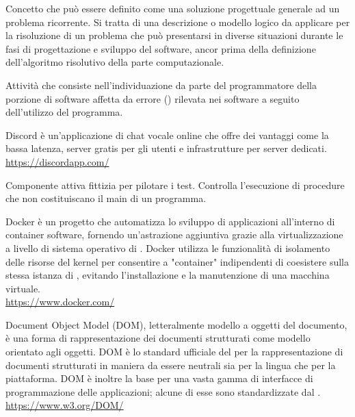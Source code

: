 Concetto che può essere definito come una soluzione progettuale generale ad un problema ricorrente. Si tratta di una descrizione o modello logico da applicare per la risoluzione di un problema che può presentarsi in diverse situazioni durante le fasi di progettazione e sviluppo del software, ancor prima della definizione dell'algoritmo risolutivo della parte computazionale.

Attività che consiste nell'individuazione da parte del programmatore della porzione di software affetta da errore () rilevata nei software a seguito dell'utilizzo del programma.

Discord è un’applicazione di chat vocale online che offre dei vantaggi come la bassa latenza, server gratis per gli utenti e infrastrutture per server dedicati.\\
\url{https://discordapp.com/}

Componente attiva fittizia per pilotare i test. Controlla l’esecuzione di procedure che non costituiscano il main di un programma.

Docker è un progetto  che automatizza lo sviluppo di applicazioni all'interno di container software, fornendo un'astrazione aggiuntiva grazie alla virtualizzazione a livello di sistema operativo di . Docker utilizza le funzionalità di isolamento delle risorse del kernel  per consentire a "container" indipendenti di coesistere sulla stessa istanza di , evitando l'installazione e la manutenzione di una macchina virtuale.\\
\url{https://www.docker.com/}

Document Object Model (DOM), letteralmente modello a oggetti del documento, è una forma di rappresentazione dei documenti strutturati come modello orientato agli oggetti.
DOM è lo standard ufficiale del  per la rappresentazione di documenti strutturati in maniera da essere neutrali sia per la lingua che per la piattaforma. DOM è inoltre la base per una vasta gamma di interfacce di programmazione delle applicazioni; alcune di esse sono standardizzate dal .\\
\url{https://www.w3.org/DOM/}
\clearpage
